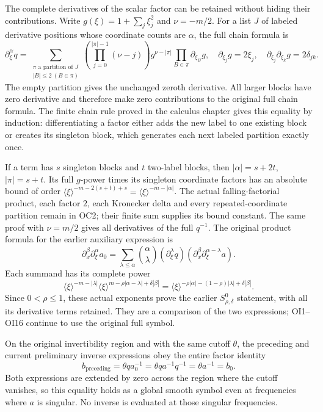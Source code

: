 \documentclass[
  11pt,
]{article}
\begin{document}
The complete derivatives of the scalar factor can be retained without
hiding their contributions. Write \(g(\xi)=1+\sum_j\xi_j^2\) and
\(\nu=-m/2\). For a list \(J\) of labeled derivative positions whose
coordinate counts are \(\alpha\), the full chain formula is \[
\partial_\xi^\alpha q
=\sum_{\substack{\pi\text{ a partition of }J\\
                  |B|\leq2\ (B\in\pi)}}
 \left(\prod_{j=0}^{|\pi|-1}(\nu-j)\right)
 g^{\nu-|\pi|}
 \prod_{B\in\pi}\partial_{\xi_B}g,
\quad
\partial_{\xi_j}g=2\xi_j,\quad
\partial_{\xi_j}\partial_{\xi_k}g=2\delta_{jk}.
\tag{OC2}
\] The empty partition gives the unchanged zeroth derivative. All larger
blocks have zero derivative and therefore make zero contributions to the
original full chain formula. The finite chain rule proved in the
calculus chapter gives this equality by induction: differentiating a
factor either adds the new label to one existing block or creates its
singleton block, which generates each next labeled partition exactly
once.

If a term has \(s\) singleton blocks and \(t\) two-label blocks, then
\(|\alpha|=s+2t\), \(|\pi|=s+t\). Its full \(g\)-power times its
singleton coordinate factors has an absolute bound of order
\(\langle\xi\rangle^{-m-2(s+t)+s}
=\langle\xi\rangle^{-m-|\alpha|}\). The actual falling-factorial
product, each factor \(2\), each Kronecker delta and every
repeated-coordinate partition remain in OC2; their finite sum supplies
its bound constant. The same proof with \(\nu=m/2\) gives all
derivatives of the full \(q^{-1}\). The original product formula for the
earlier auxiliary expression is \[
\partial_x^\beta\partial_\xi^\alpha a_0
=\sum_{\lambda\leq\alpha}\binom{\alpha}{\lambda}
 (\partial_\xi^\lambda q)
 (\partial_x^\beta\partial_\xi^{\alpha-\lambda}a).
\tag{OC3}
\] Each summand has its complete power \[
\langle\xi\rangle^{-m-|\lambda|}
\langle\xi\rangle^{m-\rho|\alpha-\lambda|+\delta|\beta|}
=\langle\xi\rangle^{-\rho|\alpha|-(1-\rho)|\lambda|+\delta|\beta|}.
\tag{OC4}
\] Since \(0<\rho\leq1\), these actual exponents prove the earlier
\(S^0_{\rho,\delta}\) statement, with all its derivative terms retained.
They are a comparison of the two expressions; OI1--OI16 continue to use
the original full symbol.

On the original invertibility region and with the same cutoff
\(\theta\), the preceding and current preliminary inverse expressions
obey the entire factor identity \[
b_{\mathrm{preceding}}
=\theta q a_0^{-1}
=\theta q a^{-1}q^{-1}
=\theta a^{-1}=b_0 .
\tag{OC5}
\] Both expressions are extended by zero across the region where the
cutoff vanishes, so this equality holds as a global smooth symbol even
at frequencies where \(a\) is singular. No inverse is evaluated at those
singular frequencies.
\end{document}
